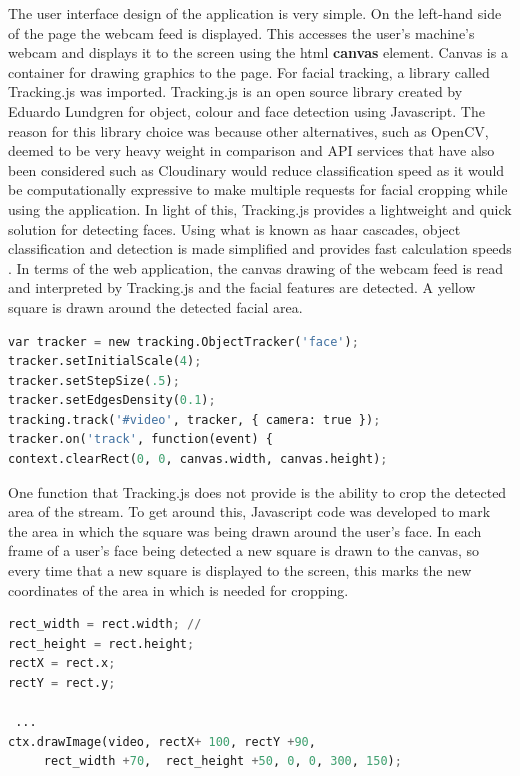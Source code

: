 The user interface design of the application is very simple. On the left-hand side of the page the webcam feed is displayed. This accesses the user's machine's webcam and displays it to the screen using the html \textbf{canvas} element. Canvas is a container for drawing graphics to the page. For facial tracking, a library called Tracking.js was imported. Tracking.js is an open source library created by Eduardo Lundgren for object, colour and face detection using Javascript. The reason for this library choice was because other alternatives, such as OpenCV, deemed to be very heavy weight in comparison and API services that have also been considered such as Cloudinary would reduce classification speed as it would be computationally expressive to make multiple requests for facial cropping while using the application. 
In light of this, Tracking.js provides a lightweight and quick solution for detecting faces. Using what is known as haar cascades, object classification and detection is made simplified and provides fast calculation speeds \citep{viola}. In terms of the web application, the canvas drawing of the webcam feed is read and interpreted by Tracking.js and the facial features are detected. A yellow square is drawn around the detected facial area.

\begin{lstlisting}[language=python, frame=single]
var tracker = new tracking.ObjectTracker('face');
tracker.setInitialScale(4);
tracker.setStepSize(.5);
tracker.setEdgesDensity(0.1);
tracking.track('#video', tracker, { camera: true });
tracker.on('track', function(event) {
context.clearRect(0, 0, canvas.width, canvas.height);
\end{lstlisting}

One function that Tracking.js does not provide is the ability to crop the detected area of the stream. To get around this, Javascript code was developed to mark the area in which the square was being drawn around the user's face. In each frame of a user's face being detected a new square is drawn to the canvas, so every time that a new square is displayed to the screen, this marks the new coordinates of the area in which is needed for cropping. 

\begin{lstlisting}[language=python, frame=single]
rect_width = rect.width; // 
rect_height = rect.height;
rectX = rect.x;
rectY = rect.y;

 ...
ctx.drawImage(video, rectX+ 100, rectY +90,
	 rect_width +70,  rect_height +50, 0, 0, 300, 150);
\end{lstlisting}

